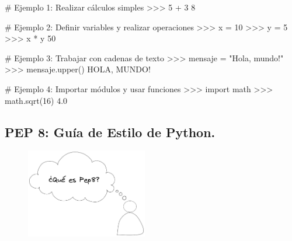 \documentclass[
  a4paper,
  DIV=11,
  numbers=noendperiod,
  onepage,
  openany]{scrreprt}
\newenvironment{Shaded}{\begin{snugshade}}{\end{snugshade}}
\newcommand{\CommentTok}[1]{\textcolor[rgb]{0.37,0.37,0.37}{#1}}
\newcommand{\DecValTok}[1]{\textcolor[rgb]{0.68,0.00,0.00}{#1}}
\newcommand{\FloatTok}[1]{\textcolor[rgb]{0.68,0.00,0.00}{#1}}
\newcommand{\ImportTok}[1]{\textcolor[rgb]{0.00,0.46,0.62}{#1}}
\newcommand{\NormalTok}[1]{\textcolor[rgb]{0.00,0.23,0.31}{#1}}
\newcommand{\OperatorTok}[1]{\textcolor[rgb]{0.37,0.37,0.37}{#1}}
\newcommand{\StringTok}[1]{\textcolor[rgb]{0.13,0.47,0.30}{#1}}
\begin{document}
\begin{Shaded}
\begin{Highlighting}[]
\CommentTok{\# Ejemplo 1: Realizar cálculos simples}
\OperatorTok{\textgreater{}\textgreater{}\textgreater{}} \DecValTok{5} \OperatorTok{+} \DecValTok{3}
\DecValTok{8}

\CommentTok{\# Ejemplo 2: Definir variables y realizar operaciones}
\OperatorTok{\textgreater{}\textgreater{}\textgreater{}}\NormalTok{ x }\OperatorTok{=} \DecValTok{10}
\OperatorTok{\textgreater{}\textgreater{}\textgreater{}}\NormalTok{ y }\OperatorTok{=} \DecValTok{5}
\OperatorTok{\textgreater{}\textgreater{}\textgreater{}}\NormalTok{ x }\OperatorTok{*}\NormalTok{ y}
\DecValTok{50}

\CommentTok{\# Ejemplo 3: Trabajar con cadenas de texto}
\OperatorTok{\textgreater{}\textgreater{}\textgreater{}}\NormalTok{ mensaje }\OperatorTok{=} \StringTok{"Hola, mundo!"}
\OperatorTok{\textgreater{}\textgreater{}\textgreater{}}\NormalTok{ mensaje.upper()}
\CommentTok{\textquotesingle{}HOLA, MUNDO!\textquotesingle{}}

\CommentTok{\# Ejemplo 4: Importar módulos y usar funciones}
\OperatorTok{\textgreater{}\textgreater{}\textgreater{}} \ImportTok{import}\NormalTok{ math}
\OperatorTok{\textgreater{}\textgreater{}\textgreater{}}\NormalTok{ math.sqrt(}\DecValTok{16}\NormalTok{)}
\FloatTok{4.0}
\end{Highlighting}
\end{Shaded}

\subsection{PEP 8: Guía de Estilo de
Python.}\label{pep-8-guuxeda-de-estilo-de-python.}

\begin{figure}

{\centering \includegraphics[width=2.08333in,height=\textheight]{unidades/unidad1/images/Que es pep8.png}

}

\end{figure}
\end{document}
